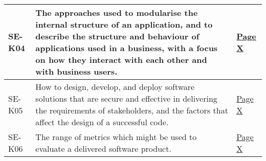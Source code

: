 \begin{longtable}{|p{2.5cm}|p{10cm}|p{1.5cm}|}
      SE-K04              & The approaches used to modularise the internal structure of an
                            application, and to describe the structure and behaviour of applications
                            used in a business, with a focus on how they interact with each other
                            and with business users. & \hyperref[sec:cicd]{Page X} \\ \hline

      SE-K05              & How to design, develop, and deploy software solutions that are secure
                            and effective in delivering the requirements of stakeholders, and
                            the factors that affect the design of a successful code. & \hyperref[sec:cicd]{Page X} \\ \hline

      SE-K06              & The range of metrics which might be used to evaluate a delivered
                            software product. & \hyperref[sec:cicd]{Page X} \\ \hline

      
    \end{longtable}